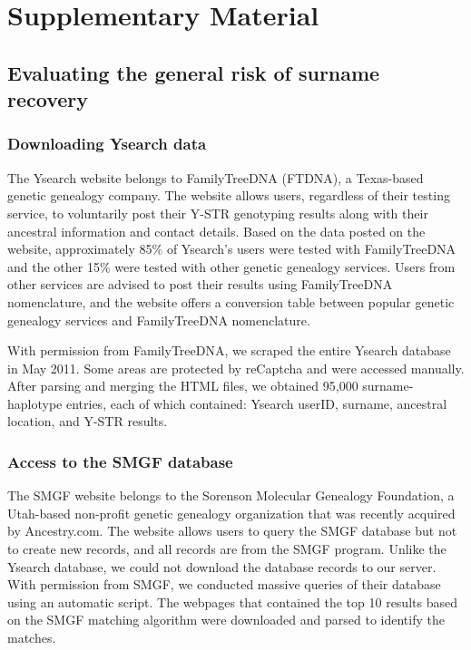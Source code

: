 \section{Supplementary Material}
\label{sec:sursm}

\subsection{Evaluating the general risk of surname recovery}
\subsubsection{Downloading Ysearch data}
The Ysearch website belongs to FamilyTreeDNA (FTDNA), a Texas-based genetic genealogy company. The website allows users, regardless of their testing service, to voluntarily post their Y-STR genotyping results along with their ancestral information and contact details. Based on the data posted on the website, approximately 85\% of Ysearch's users were tested with FamilyTreeDNA and the other 15\% were tested with other genetic genealogy services. Users from other services are advised to post their results using FamilyTreeDNA nomenclature, and the website offers a conversion table between popular genetic genealogy services and FamilyTreeDNA nomenclature.

With permission from FamilyTreeDNA, we scraped the entire Ysearch database in May 2011. Some areas are protected by reCaptcha and were accessed manually. After parsing and merging the HTML files, we obtained 95,000 surname-haplotype entries, each of which contained: Ysearch userID, surname, ancestral location, and Y-STR results. 

\subsubsection{Access to the SMGF database}
The SMGF website belongs to the Sorenson Molecular Genealogy Foundation, a Utah-based non-profit genetic genealogy organization that was recently acquired by Ancestry.com. The website allows users to query the SMGF database but not to create new records, and all records are from the SMGF program. Unlike the Ysearch database, we could not download the database records to our server. With permission from SMGF, we conducted massive queries of their database using an automatic script. The webpages that contained the top 10 results based on the SMGF matching algorithm were downloaded and parsed to identify the matches. 

